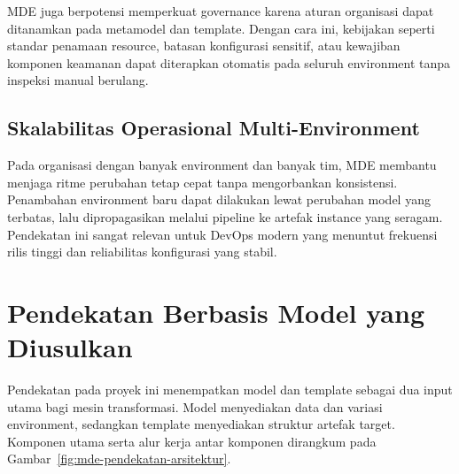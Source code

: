 MDE juga berpotensi memperkuat governance karena aturan organisasi dapat ditanamkan pada metamodel dan template. Dengan cara ini, kebijakan seperti standar penamaan resource, batasan konfigurasi sensitif, atau kewajiban komponen keamanan dapat diterapkan otomatis pada seluruh environment tanpa inspeksi manual berulang.

\subsection[Skalabilitas Operasional]{Skalabilitas Operasional Multi-Environment}\label{subsec:mde-devops-multienv}

Pada organisasi dengan banyak environment dan banyak tim, MDE membantu menjaga ritme perubahan tetap cepat tanpa mengorbankan konsistensi. Penambahan environment baru dapat dilakukan lewat perubahan model yang terbatas, lalu dipropagasikan melalui pipeline ke artefak instance yang seragam. Pendekatan ini sangat relevan untuk DevOps modern yang menuntut frekuensi rilis tinggi dan reliabilitas konfigurasi yang stabil.

\section[Pendekatan Berbasis Model yang Diusulkansec]{Pendekatan Berbasis Model yang Diusulkan}\label{sec:mde-pendekatan}

Pendekatan pada proyek ini menempatkan model dan template sebagai dua input utama bagi mesin transformasi. Model menyediakan data dan variasi environment, sedangkan template menyediakan struktur artefak target. Komponen utama serta alur kerja antar komponen dirangkum pada Gambar~\ref{fig:mde-pendekatan-arsitektur}.

